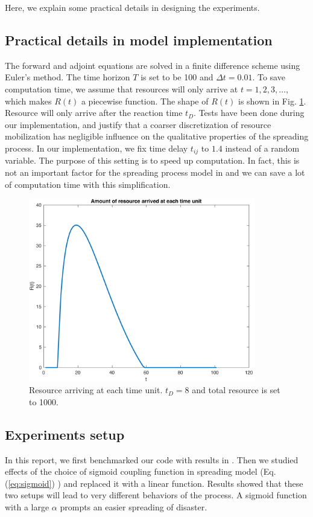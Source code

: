Here, we explain some practical details in designing the experiments.

\subsection{Practical details in model implementation}
\label{sec:implementIssues}
The forward and adjoint equations are solved in a finite difference scheme using Euler's method. The time horizon $T$ is set to be 100 and $\Delta t = 0.01$. To save computation time, we assume that resources will only arrive at $t = 1, 2, 3, \ldots$, which makes $R(t)$ a piecewise function. The shape of $R(t)$ is shown in Fig. \ref{fig:resource}. Resource will only arrive after the reaction time $t_D$. Tests have been done during our implementation, and justify that a coarser discretization of resource mobilization has negligible influence on the qualitative  properties of the spreading process. In our implementation, we fix time delay $t_{ij}$ to $1.4$ instead of a random variable. The purpose of this setting is to speed up computation. In fact, this is not an important factor for the spreading process model in \cite{buzna2007efficient} and we can save a lot of computation time with this simplification.

\begin{figure}[!tb]	
	\centering
	\includegraphics[height=80mm]{../figs/resource_small.pdf}
	\caption{Resource arriving at each time unit. $t_D=8$ and total resource is set to 1000.}
	\label{fig:resource}
\end{figure}

\subsection{Experiments setup}
\label{sec:experimentsSetup}
In this report, we first benchmarked our code with results in \cite{buzna2007efficient}. Then we studied effects of the choice of sigmoid coupling function in spreading model (Eq. (\ref{eq:sigmoid}) ) and replaced it with a linear function. Results showed that these two setups will lead to very different behaviors of the process. A sigmoid function with a large $\alpha$ prompts an easier spreading of disaster. 

